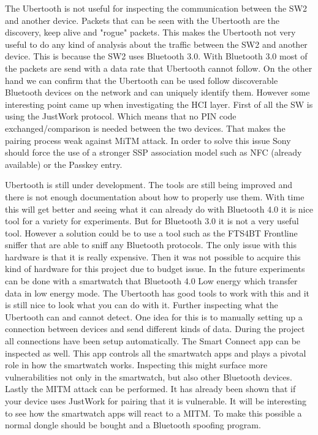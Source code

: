 The Ubertooth is not useful for inspecting the communication between the SW2 and another device. Packets that can be seen with the Ubertooth are the discovery, keep alive and  "rogue" packets. This makes the Ubertooth not very useful to do any kind of analysis about the traffic between the SW2 and another device. This is because the SW2 uses Bluetooth 3.0. With Bluetooth 3.0  most of the packets are send with a data rate that Ubertooth cannot follow. On the other hand we can confirm that the Ubertooth can be used follow discoverable Bluetooth devices on the network and can uniquely identify them. \pend 
However some interesting point came up when investigating the HCI layer. First of all the SW is using the JustWork protocol. Which means that no PIN code exchanged/comparison is needed between the two devices. That makes the pairing process weak against MiTM attack. In order to solve this issue Sony should force the use of a stronger SSP association model such as NFC (already available) or the Passkey entry.   

Ubertooth is still under development. The tools are still being improved and there is not enough documentation about how to properly use them. With time this will get better and seeing what it can already do with Bluetooth 4.0 it is nice tool for a variety for experiments. But for Bluetooth 3.0 it is not a very useful tool. However a solution could be to use a tool such as the FTS4BT Frontline sniffer \cite{FTS4BT} that are able to sniff any Bluetooth protocols. The only issue with this hardware is that it is really expensive. Then it was not possible to acquire this kind of hardware for this project due to budget issue.
\pend
In the future experiments can be done with a smartwatch that Bluetooth 4.0 Low energy which transfer data in low energy mode. The Ubertooth has good tools to work with this and it is still nice to look what you can do with it.
Further inspecting what the Ubertooth can and cannot detect. One idea for this is to manually setting up a connection between devices and send different kinds of data. During the project all connections have been setup automatically. \pend
The Smart Connect app can be inspected as well. This app controls all the smartwatch apps and plays a pivotal role in how the smartwatch works. Inspecting this might surface more vulnerabilities not only in the smartwatch, but also other Bluetooth devices. \pend
Lastly the MITM attack can be performed. It has already been shown that if your device uses JustWork for pairing that it is vulnerable. It will be interesting to see how the smartwatch apps will react to a MITM. To make this possible a normal dongle should be bought and a Bluetooth spoofing program.